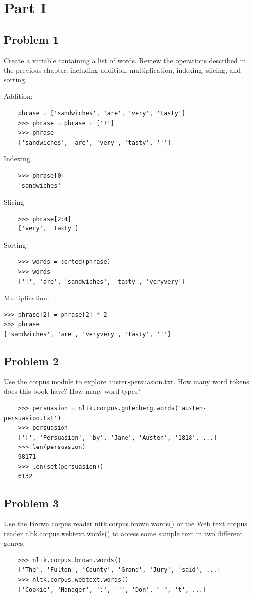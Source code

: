 \documentclass[12pt]{article}
\begin{document}
	\section*{Part I}
	
	\subsection*{Problem 1} Create a variable  containing a list of words. Review the operations described in the previous chapter, including addition, multiplication, indexing, slicing, and sorting.  
	
	Addition:
		\begin{lstlisting}
	phrase = ['sandwiches', 'are', 'very', 'tasty']
	>>> phrase = phrase + ['!']
	>>> phrase
	['sandwiches', 'are', 'very', 'tasty', '!']
	\end{lstlisting}
	Indexing
	\begin{lstlisting}
	>>> phrase[0]
	'sandwiches'
	\end{lstlisting}
	Slicing
	\begin{lstlisting}
	>>> phrase[2:4]
	['very', 'tasty']
	\end{lstlisting}
	Sorting:
	\begin{lstlisting}
	>>> words = sorted(phrase)
	>>> words
	['!', 'are', 'sandwiches', 'tasty', 'veryvery']
	\end{lstlisting}
	Multiplication:
		\begin{lstlisting}
>>> phrase[2] = phrase[2] * 2
>>> phrase
['sandwiches', 'are', 'veryvery', 'tasty', '!']
	\end{lstlisting}
	
	\subsection*{Problem 2}  Use the corpus module to explore austen-persuasion.txt. How many word tokens does this book have? How many word types?
	\begin{lstlisting}
	>>> persuasion = nltk.corpus.gutenberg.words('austen-persuasion.txt')
	>>> persuasion
	['[', 'Persuasion', 'by', 'Jane', 'Austen', '1818', ...]
	>>> len(persuasion)
	98171
	>>> len(set(persuasion))
	6132
	\end{lstlisting}
	
	\subsection*{Problem 3} Use the Brown corpus reader nltk.corpus.brown.words() or the Web text corpus reader nltk.corpus.webtext.words() to access some sample text in two different genres.
	\begin{lstlisting}
	>>> nltk.corpus.brown.words()
	['The', 'Fulton', 'County', 'Grand', 'Jury', 'said', ...]
	>>> nltk.corpus.webtext.words()
	['Cookie', 'Manager', ':', '"', 'Don', "'", 't', ...]
	\end{lstlisting}
	
\end{document}
